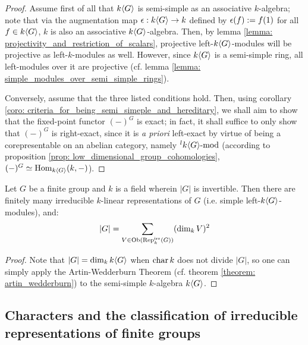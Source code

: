                 \begin{proof}
                    Assume first of all that $k\langle G\rangle$ is semi-simple as an associative $k$-algebra; note that via the augmentation map $\epsilon: k\langle G\rangle \to k$ defined by $\epsilon(f) := f(1)$ for all $f \in k\langle G\rangle$, $k$ is also an associative $k\langle G\rangle$-algebra. Then, by lemma \ref{lemma: projectivity_and_restriction_of_scalars}, projective left-$k\langle G\rangle$-modules will be projective as left-$k$-modules as well. However, since $k\langle G\rangle$ is a semi-simple ring, all left-modules over it are projective (cf. lemma \ref{lemma: simple_modules_over_semi_simple_rings}).
                    
                    Conversely, assume that the three listed conditions hold. Then, using corollary \ref{coro: criteria_for_being_semi_simeple_and_hereditary}, we shall aim to show that the fixed-point functor $(-)^G$ is exact; in fact, it shall suffice to only show that $(-)^G$ is right-exact, since it is \textit{a priori} left-exact by virtue of being a corepresentable on an abelian category, namely ${}^lk\langle G\rangle\text{-}\mathrm{mod}$ (according to proposition \ref{prop: low_dimensional_group_cohomologies}, $(-)^G \simeq \mathrm{Hom}_{k\langle G\rangle}(k, -)$).  
                \end{proof}
            \begin{example}
                
            \end{example}
            \begin{corollary} \label{coro: sum_of_squares_formula_for_finite_groups}
                Let $G$ be a finite group and $k$ is a field wherein $|G|$ is invertible. Then there are finitely many irreducible $k$-linear representations of $G$ (i.e. simple left-$k\langle G\rangle$-modules), and:
                    $$|G| = \sum_{V \in \mathrm{Ob}(\mathrm{Rep}_k^{\mathrm{irr}}(G))} (\dim_k V)^2$$
            \end{corollary}
                \begin{proof}
                    Note that $|G| = \dim_k k\langle G\rangle$ when $\operatorname{char} k$ does not divide $|G|$, so one can simply apply the Artin-Wedderburn Theorem (cf. theorem \ref{theorem: artin_wedderburn}) to the semi-simple $k$-algebra $k\langle G\rangle$.
                \end{proof}
                
        \subsection{Characters and the classification of irreducible representations of finite groups}
    
    \printbibliography

